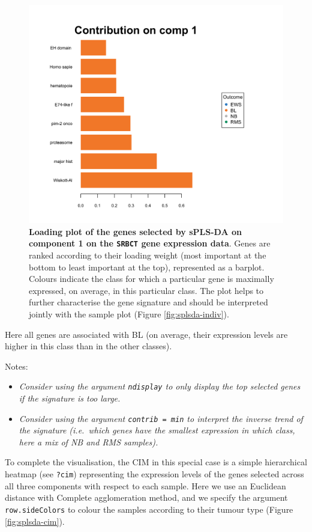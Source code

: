 \documentclass[]{book}
\providecommand{\tightlist}{%
  \setlength{\itemsep}{0pt}\setlength{\parskip}{0pt}}
\begin{document}
\begin{figure}

{\centering \includegraphics[width=0.5\linewidth]{Figures/PLSDA/splsda-plotloading-1} 

}

\caption{\textbf{Loading plot of the genes selected by
sPLS-DA on component 1 on the \texttt{SRBCT} gene expression data}.
Genes are ranked according to their loading weight (most important at
the bottom to least important at the top), represented as a barplot.
Colours indicate the class for which a particular gene is maximally
expressed, on average, in this particular class. The plot helps to
further characterise the gene signature and should be interpreted
jointly with the sample plot (Figure \ref{fig:splsda-indiv}).}\label{fig:splsda-plotloading}
\end{figure}










Here all genes are associated with BL (on average, their expression
levels are higher in this class than in the other classes).

Notes:

\begin{itemize}
\tightlist
\item
  \emph{Consider using the argument \texttt{ndisplay} to only display
  the top selected genes if the signature is too large.}
\item
  \emph{Consider using the argument
  \texttt{contrib\ =\ \textquotesingle{}min\textquotesingle{}} to
  interpret the inverse trend of the signature (i.e.~which genes have
  the smallest expression in which class, here a mix of NB and RMS
  samples).}
\end{itemize}

To complete the visualisation, the CIM in this special case is a simple
hierarchical heatmap (see \texttt{?cim}) representing the expression
levels of the genes selected across all three components with respect to
each sample. Here we use an Euclidean distance with Complete
agglomeration method, and we specify the argument
\texttt{row.sideColors} to colour the samples according to their tumour
type (Figure \ref{fig:splsda-cim}).
\end{document}
